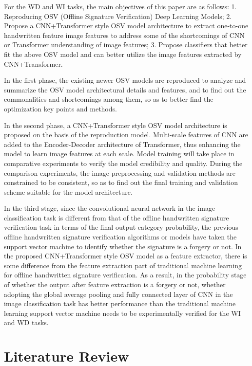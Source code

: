 \documentclass{article}
\begin{document}
For the WD and WI tasks, the main objectives of this paper are as follows: 1. Reproducing OSV (Offline Signature Verification) Deep Learning Models; 2. Propose a CNN+Transformer style OSV model architecture to extract one-to-one handwritten feature image features to address some of the shortcomings of CNN or Transformer understanding of image features; 3. Propose classifiers that better fit the above OSV model and can better utilize the image features extracted by CNN+Transformer.

In the first phase, the existing newer OSV models are reproduced to analyze and summarize the OSV model architectural details and features, and to find out the commonalities and shortcomings among them, so as to better find the optimization key points and methods.

In the second phase, a CNN+Transformer style OSV model architecture is proposed on the basis of the reproduction model. Multi-scale features of CNN are added to the Encoder-Decoder architecture of Transformer, thus enhancing the model to learn image features at each scale. Model training will take place in comparative experiments to verify the model credibility and quality. During the comparison experiments, the image preprocessing and validation methods are constrained to be consistent, so as to find out the final training and validation scheme suitable for the model architecture.

In the third stage, since the convolutional neural network in the image classification task is different from that of the offline handwritten signature verification task in terms of the final output category probability, the previous offline handwritten signature verification algorithms or models have taken the support vector machine to identify whether the signature is a forgery or not. In the proposed CNN+Transformer style OSV model as a feature extractor, there is some difference from the feature extraction part of traditional machine learning for offline handwritten signature verification. As a result, in the probability stage of whether the output after feature extraction is a forgery or not, whether adopting the global average pooling and fully connected layer of CNN in the image classification task has better performance than the traditional machine learning support vector machine needs to be experimentally verified for the WI and WD tasks.

\newpage
\section{Literature Review}
\end{document}
